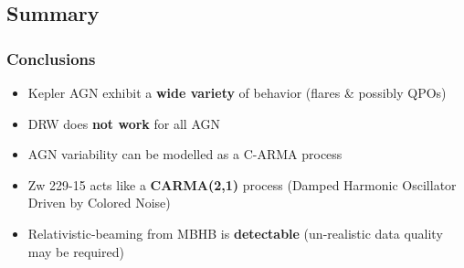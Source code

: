 \documentclass[hyperref={pdfpagelabels=false}]{beamer}
\begin{document}
\subsection{Summary}

\begin{frame}
\frametitle{Conclusions}
  \begin{itemize}
    \item Kepler AGN exhibit a \textbf{wide variety} of behavior (flares \& possibly QPOs)
    \item DRW does \textbf{not work} for all AGN
    \item AGN variability can be modelled as a C-ARMA process
    \item Zw 229-15 acts like a \textbf{CARMA(2,1)} process (Damped Harmonic Oscillator Driven by Colored Noise)
    \item Relativistic-beaming from MBHB is \textbf{detectable} (un-realistic data quality may be required)
  \end{itemize}
\end{frame}
\end{document}
